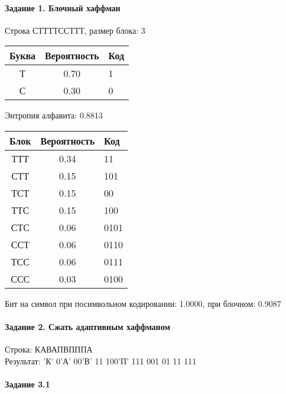 \documentclass[a4paper, 12pt]{article}
\begin{document}
\paragraph{Задание 1. Блочный хаффман \\}

Строка СТТТТССТТТ, размер блока: 3
\begin{center}
 \begin{tabular}{ |c|c|l| } 
  \hline
     Буква & Вероятность & Код\\ \hline
Т & 0.70 & 1\\\hline
С & 0.30 & 0
\\ \hline \end{tabular}
\end{center}
Энтропия алфавита: 0.8813
\begin{center}
 \begin{tabular}{ |c|c|l| } 
  \hline
     Блок & Вероятность & Код\\ \hline
ТТТ & 0.34 & 11\\\hline
СТТ & 0.15 & 101\\\hline
ТСТ & 0.15 & 00\\\hline
ТТС & 0.15 & 100\\\hline
СТС & 0.06 & 0101\\\hline
ССТ & 0.06 & 0110\\\hline
ТСС & 0.06 & 0111\\\hline
ССС & 0.03 & 0100
\\ \hline \end{tabular}
\end{center}
Бит на символ при посимвольном кодировании: 1.0000, при блочном: 0.9087


\pagebreak
\paragraph{Задание 2. Сжать адаптивным хаффманом\\}

Строка: 
КАВАПВПППА\\
Результат: 'К' 0'А' 00'В' 11 100'П' 111 001 01 11 111










\pagebreak
\paragraph{Задание 3.1}
\end{document}
